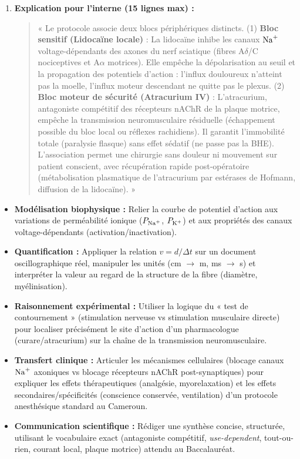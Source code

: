\documentclass[11pt]{article}
\newcounter{popsec}
\newcounter{popsub}
\newcommand{\courssub}[1]{%
  \stepcounter{popsub}%
  \par\vspace{9pt}\noindent{\popxbold\fontsize{11.5}{13}\selectfont\color{popink}{\color{poporange}\thepopsec.\thepopsub}\hspace{6pt}#1}\par\nopagebreak\vspace{4pt}
}
\begin{document}
\begin{exoresolu}
\begin{enumerate}
    \item \textbf{Explication pour l'interne (15 lignes max) :}
    \begin{quote}
    \footnotesize
    « Le protocole associe deux blocs périphériques distincts. (1) \textbf{Bloc sensitif (Lidocaïne locale)} : La lidocaïne inhibe les canaux $\ce{Na+}$ voltage-dépendants des axones du nerf sciatique (fibres A$\delta$/C nociceptives et A$\alpha$ motrices). Elle empêche la dépolarisation au seuil et la propagation des potentiels d'action : l'influx douloureux n'atteint pas la moelle, l'influx moteur descendant ne quitte pas le plexus. (2) \textbf{Bloc moteur de sécurité (Atracurium IV)} : L'atracurium, antagoniste compétitif des récepteurs nAChR de la plaque motrice, empêche la transmission neuromusculaire résiduelle (échappement possible du bloc local ou réflexes rachidiens). Il garantit l'immobilité totale (paralysie flasque) sans effet sédatif (ne passe pas la BHE). L'association permet une chirurgie sans douleur ni mouvement sur patient conscient, avec récupération rapide post-opératoire (métabolisation plasmatique de l'atracurium par estérases de Hofmann, diffusion de la lidocaïne). »
    \end{quote}
\end{enumerate}
\end{exoresolu}

\courssub{Bilan de l'activité}
\begin{aretenir}
\begin{itemize}
\item \textbf{Modélisation biophysique :} Relier la courbe de potentiel d'action aux variations de perméabilité ionique ($P_{\ce{Na+}}$, $P_{\ce{K+}}$) et aux propriétés des canaux voltage-dépendants (activation/inactivation).
\item \textbf{Quantification :} Appliquer la relation $v = d/\Delta t$ sur un document oscillographique réel, manipuler les unités (cm $\rightarrow$ m, ms $\rightarrow$ s) et interpréter la valeur au regard de la structure de la fibre (diamètre, myélinisation).
\item \textbf{Raisonnement expérimental :} Utiliser la logique du « test de contournement » (stimulation nerveuse vs stimulation musculaire directe) pour localiser précisément le site d'action d'un pharmacologue (curare/atracurium) sur la chaîne de la transmission neuromusculaire.
\item \textbf{Transfert clinique :} Articuler les mécanismes cellulaires (blocage canaux $\ce{Na+}$ axoniques vs blocage récepteurs nAChR post-synaptiques) pour expliquer les effets thérapeutiques (analgésie, myorelaxation) et les effets secondaires/spécificités (conscience conservée, ventilation) d'un protocole anesthésique standard au Cameroun.
\item \textbf{Communication scientifique :} Rédiger une synthèse concise, structurée, utilisant le vocabulaire exact (antagoniste compétitif, \emph{use-dependent}, tout-ou-rien, courant local, plaque motrice) attendu au Baccalauréat.
\end{itemize}
\end{aretenir}
\end{document}
